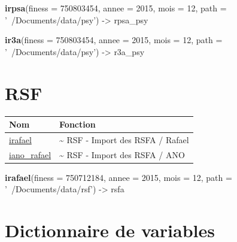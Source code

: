 \documentclass[]{book}
\newenvironment{Shaded}{\begin{snugshade}}{\end{snugshade}}
\newcommand{\KeywordTok}[1]{\textcolor[rgb]{0.13,0.29,0.53}{\textbf{{#1}}}}
\newcommand{\DataTypeTok}[1]{\textcolor[rgb]{0.13,0.29,0.53}{{#1}}}
\newcommand{\DecValTok}[1]{\textcolor[rgb]{0.00,0.00,0.81}{{#1}}}
\newcommand{\StringTok}[1]{\textcolor[rgb]{0.31,0.60,0.02}{{#1}}}
\newcommand{\CommentTok}[1]{\textcolor[rgb]{0.56,0.35,0.01}{\textit{{#1}}}}
\newcommand{\NormalTok}[1]{{#1}}
\begin{document}
\begin{Shaded}
\begin{Highlighting}[]
\KeywordTok{irpsa}\NormalTok{(}\DataTypeTok{finess =} \DecValTok{750803454}\NormalTok{,}
      \DataTypeTok{annee =} \DecValTok{2015}\NormalTok{,}
      \DataTypeTok{mois =} \DecValTok{12}\NormalTok{,}
      \DataTypeTok{path =} \StringTok{'~/Documents/data/psy'}\NormalTok{) ->}\StringTok{ }\NormalTok{rpsa_psy}

\KeywordTok{ir3a}\NormalTok{(}\DataTypeTok{finess =} \DecValTok{750803454}\NormalTok{,}
      \DataTypeTok{annee =} \DecValTok{2015}\NormalTok{,}
      \DataTypeTok{mois =} \DecValTok{12}\NormalTok{,}
      \DataTypeTok{path =} \StringTok{'~/Documents/data/psy'}\NormalTok{) ->}\StringTok{ }\NormalTok{r3a_psy}
\end{Highlighting}
\end{Shaded}

\section{RSF}\label{rsf}

\begin{longtable}[]{@{}ll@{}}
\toprule
Nom & Fonction\tabularnewline
\midrule
\endhead
\href{https://github.com/IM-APHP/pmeasyr/tree/master/Rd_md/irafael.Rmd}{irafael}
& \textasciitilde{} RSF - Import des RSFA / Rafael\tabularnewline
\href{https://github.com/IM-APHP/pmeasyr/tree/master/Rd_md/iano_rafael.Rmd}{iano\_rafael}
& \textasciitilde{} RSF - Import des RSFA / ANO\tabularnewline
\bottomrule
\end{longtable}

\begin{Shaded}
\begin{Highlighting}[]
\KeywordTok{irafael}\NormalTok{(}\DataTypeTok{finess =} \DecValTok{750712184}\NormalTok{,}
        \DataTypeTok{annee =} \DecValTok{2015}\NormalTok{,}
        \DataTypeTok{mois =} \DecValTok{12}\NormalTok{,}
        \DataTypeTok{path =} \StringTok{'~/Documents/data/rsf'}\NormalTok{) ->}\StringTok{ }\NormalTok{rsfa}
\end{Highlighting}
\end{Shaded}

\section{Dictionnaire de variables}\label{dictionnaire-de-variables}

\begin{Shaded}
\end{Shaded}
\end{document}

